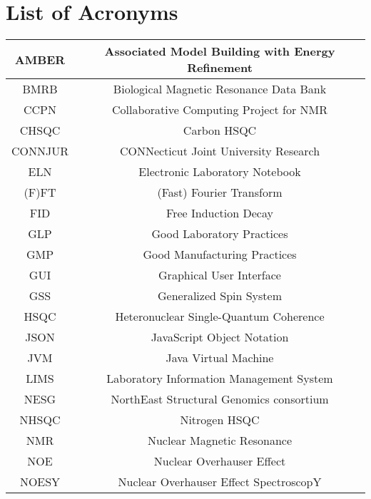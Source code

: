 \chapter*{List of Acronyms}

\begin{center}
    \begin{longtable}{ | c || c | }
    \hline
    AMBER   & Associated Model Building with Energy Refinement  \\  \hline
    BMRB    & Biological Magnetic Resonance Data Bank   \\  \hline 
    CCPN    & Collaborative Computing Project for NMR   \\  \hline 
    CHSQC   & Carbon HSQC                               \\  \hline
    CONNJUR & CONNecticut Joint University Research     \\  \hline 
    ELN     & Electronic Laboratory Notebook            \\  \hline 
    (F)FT   & (Fast) Fourier Transform                  \\  \hline 
    FID     & Free Induction Decay                      \\  \hline 
    GLP     & Good Laboratory Practices                 \\  \hline 
    GMP     & Good Manufacturing Practices              \\  \hline 
    GUI     & Graphical User Interface                  \\  \hline 
    GSS     & Generalized Spin System                   \\  \hline
    HSQC    & Heteronuclear Single-Quantum Coherence    \\  \hline 
    JSON    & JavaScript Object Notation                \\  \hline 
    JVM     & Java Virtual Machine                      \\  \hline 
    LIMS    & Laboratory Information Management System  \\  \hline 
    NESG    & NorthEast Structural Genomics consortium  \\  \hline 
    NHSQC   & Nitrogen HSQC                             \\  \hline
    NMR     & Nuclear Magnetic Resonance                \\  \hline
    NOE     & Nuclear Overhauser Effect                 \\  \hline 
    NOESY   & Nuclear Overhauser Effect SpectroscopY    \\  \hline 

\end{longtable}
\end{center}
